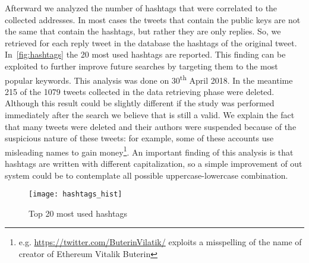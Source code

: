 Afterward we analyzed the number of hashtags that were
correlated to the collected addresses.
In most cases the tweets that
contain the public keys are not the same that contain the hashtags, but rather
they are only replies.
So, we retrieved for each reply tweet in the database the hashtags of the
original tweet.
In~\autoref{fig:hashtags} the 20 most used hashtags are reported.
This finding can be exploited to further improve future searches by targeting
them to the most popular keywords.
This analysis was done on 30\textsuperscript{th} April 2018. In the
meantime 215 of the 1079 tweets collected in the data retrieving phase were
deleted. Although
this result could be slightly different if the study was performed immediately
after the search we believe that is still a valid. 
We explain the fact
that many tweets were deleted and their authors were suspended because of
the suspicious nature of these tweets: for example, some of 
these accounts use misleading names to gain
money\footnote{e.g. \url{https://twitter.com/ButerinVilatik/} exploits a
misspelling of the name of creator of Ethereum Vitalik Buterin}.
An important finding of this analysis is that hashtags are written with
different capitalization, so a simple improvement of out system could be to
contemplate all possible uppercase-lowercase combination.

\begin{figure}
\centering
\texttt{[image: hashtags\_hist]}
\caption{Top 20 most used hashtags}
\label{fig:hashtags}
\end{figure}